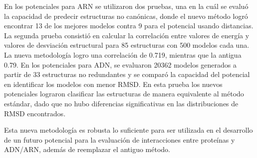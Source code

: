 \begin{singlespace}
En los potenciales para ARN se utilizaron dos pruebas, una en la cuál se evaluó la capacidad de predecir estructuras no canónicas, donde el nuevo método logró encontrar 13 de los mejores modelos 
contra 9 para el potencial usando distancias.
La segunda prueba consistió en calcular la correlación entre valores de energía y valores de desviación estructural para 85 estructuras con 500 modelos cada una. 
La nueva metodología logro una correlación de 0.719, mientras que la antigua 0.79.
En los potenciales para ADN, se evaluaron 20362 modelos generados a partir de 33 estructuras no redundantes y se comparó la capacidad del potencial en identificar los modelos con menor RMSD.
En esta prueba los nuevos potenciales lograron clasificar las estructuras de manera equivalente al método estándar, dado que no hubo diferencias significativas en las distribuciones de RMSD encontrados.
\\
\par
Esta nueva metodología es robusta lo suficiente para ser utilizada en el desarrollo de un futuro potencial para la evaluación de interacciones entre proteínas y ADN/ARN, además de reemplazar el antiguo método. 
\end{singlespace}
